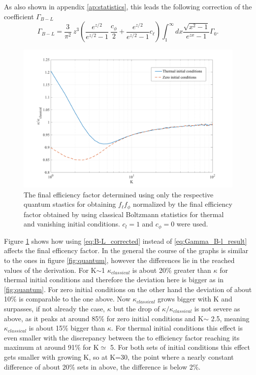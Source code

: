 As also shown in appendix \ref{ap:statistics}, this leads the following correction of the coefficient $\Gamma_{B-L}$
\begin{equation}
\Gamma_{B-L}=\frac{3}{\pi^2}\:z^3\left(\frac{e^{z/2}}{e^{z/2}-1}\:\frac{c_\phi}{2}+\frac{e^{z/2}}{e^{z/2}-1}c_\ell\right)\int_{1}^{\infty}dx\frac{\sqrt{x^2-1}}{e^{zx}-1}\Gamma_0.
\label{eq:B-L_corrected}
\end{equation}
\begin{figure}[H]
	\centering
	\includegraphics[width=\linewidth]{Images/quantum1}
	\caption{The final efficiency factor determined using only the respective quantum stastics for obtaining $f_\ell f_\phi$ normalized by the final efficiency factor obtained by using classical Boltzmann statistics for thermal and vanishing initial conditions. $c_l=1$ and $c_\phi=0$ were used.}
	\label{fig:quantum1}
\end{figure} \noindent
Figure \ref{fig:quantum1} shows how using \eqref{eq:B-L_corrected} instead of \eqref{eq:Gamma_B-l_result} affects the final efficency factor. In the general the course of the graphs is similar to the ones in figure \ref{fig:quantum}, however the differences lie in the reached values of the derivation. For K$\sim$1 $\kappa_{classical}$ is about 20\% greater than $\kappa$ for thermal initial conditions and therefore the deviation here is bigger as in \ref{fig:quantum}. For zero initial conditions on the other hand the deviation of about 10\% is comparable to the one above. Now $\kappa_{classical}$ grows bigger with K and surpasses, if not already the case, $\kappa$ but the drop of $\kappa/\kappa_{classical}$ is not severe as above, as it peaks at around 85\% for zero initial conditions and K$\sim$ 2.5, meaning $\kappa_{classical}$ is about 15\% bigger than $\kappa$. For thermal initial conditions this effect is even smaller with the discrepancy between the to efficiency factor reaching its maximum at around 91\% for K$\simeq$ 5. For both sets of initial conditions this effect gets smaller with growing K, so at K=30, the point where a nearly constant difference of about 20\% sets in above, the difference is below 2\%. \newline \indent
